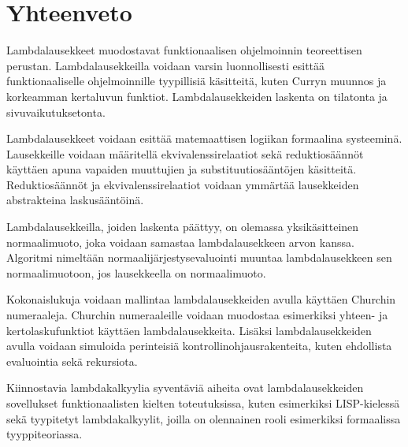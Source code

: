 \section{Yhteenveto}

Lambdalausekkeet muodostavat funktionaalisen ohjelmoinnin teoreettisen perustan. Lambdalausekkeilla voidaan varsin luonnollisesti esittää funktionaaliselle ohjelmoinnille tyypillisiä käsitteitä, kuten Curryn muunnos ja korkeamman kertaluvun funktiot. Lambdalausekkeiden laskenta on tilatonta ja sivuvaikutuksetonta. 

\par

Lambdalausekkeet voidaan esittää matemaattisen logiikan formaalina systeeminä. Lausekkeille voidaan määritellä ekvivalenssirelaatiot sekä reduktiosäännöt käyttäen apuna vapaiden muuttujien ja substituutiosääntöjen käsitteitä. Reduktiosäännöt ja ekvivalenssirelaatiot voidaan ymmärtää lausekkeiden abstrakteina laskusääntöinä.

\par

Lambdalausekkeilla, joiden laskenta päättyy, on olemassa yksikäsitteinen normaalimuoto, joka voidaan samastaa lambdalausekkeen arvon kanssa. Algoritmi nimeltään normaalijärjestysevaluointi muuntaa lambdalausekkeen sen normaalimuotoon, jos lausekkeella on normaalimuoto. 

\par

Kokonaislukuja voidaan mallintaa lambdalausekkeiden avulla käyttäen Churchin numeraaleja. Churchin numeraaleille voidaan muodostaa esimerkiksi yhteen- ja kertolaskufunktiot käyttäen lambdalausekkeita. Lisäksi lambdalausekkeiden avulla voidaan simuloida perinteisiä kontrollinohjausrakenteita, kuten ehdollista evaluointia sekä rekursiota.

\par 

Kiinnostavia lambdakalkyylia syventäviä aiheita ovat lambdalausekkeiden sovellukset funktionaalisten kielten toteutuksissa, kuten esimerkiksi LISP-kielessä sekä tyypitetyt lambdakalkyylit, joilla on olennainen rooli esimerkiksi formaalissa tyyppiteoriassa.